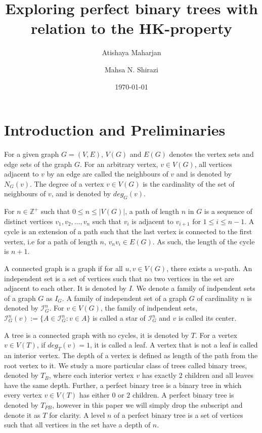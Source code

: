 \documentclass{amsart}
\title[]{Exploring perfect binary trees with relation to the HK-property}
\author[Atishaya Maharjan]{Atishaya Maharjan} \email[Atishaya Maharjan]{maharjaa@myumanitoba.ca}
\author[M.~N.~Shirazi]{Mahsa N. Shirazi} \email[M.~N.~Shirazi]{mahsa.nasrollahi@gmail.com}
\date{\today}
\theoremstyle{definition}
\begin{document}
\begin{abstract}


\end{abstract}

\maketitle

\section{Introduction and Preliminaries}

For a given graph $G = (V,E)$, $V(G)$ and $E(G)$ denotes the vertex sets and edge sets of the graph $G$. For an arbitrary vertex, $v \in V(G)$, all vertices adjacent to $v$ by an edge are called the neighbours of $v$ and is denoted by $N_G(v)$. The degree of a vertex $v \in V(G)$ is the cardinality of the set of neighbours of $v$, and is denoted by $deg_G(v)$.

For $n \in \mathbb{Z^+}$ such that  $0 \leq n \leq |V(G)|$, a path of length $n$ in $G$ is a sequence of distinct vertices $v_1, v_2, \ldots, v_n$ such that $v_i$ is adjacent to $v_{i+1}$ for $1 \leq i \leq n-1$. A cycle is an extension of a path such that the last vertex is connected to the first vertex, i.e for a path of length $n$, $v_nv_i \in E(G)$. As such, the length of the cycle is $n + 1$.

A connected graph is a graph if for all $u,v \in V(G)$, there exists a $uv$-path. An independent set is a set of vertices such that no two vertices in the set are adjacent to each other. It is denoted by $I$. We denote a family of indpendent sets of a graph $G$ as $I_G$. A family of independent set of a graph $G$ of cardinality $n$ is denoted by $\mathcal{I}^n_G$. For $v \in V(G)$, the family of indpendent sets, $\mathcal{I}^n_G(v) := \{A \in \mathcal{I}^n_G : v \in A\}$ is called a star of $\mathcal{I}^n_G$ and $v$ is called its center.

A tree is a connected graph with no cycles, it is denoted by $T$. For a vertex $v \in V(T)$, if $deg_T(v) = 1$, it is called a leaf. A vertex that is not a leaf is called an interior vertex. The depth of a vertex is defined as length of the path from the root vertex to it. We study a more particular class of trees called binary trees, denoted by $T_B$, where each interior vertex $v$ has exactly $2$ children and all leaves have the same depth. Further, a perfect binary tree is a binary tree in which every vertex $v \in V(T)$ has either $0$ or $2$ children. A perfect binary tree is denoted by $T_{PB}$, however in this paper we will simply drop the subscript and denote it as $T$ for clarity. A level $n$ of a perfect binary tree is a set of vertices such that all vertices in the set have a depth of $n$.
\end{document}
